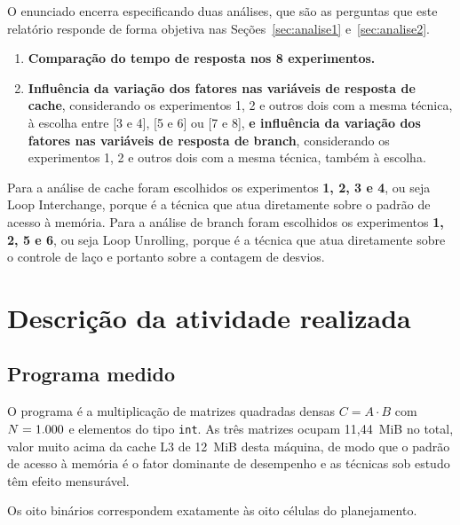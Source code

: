 \documentclass[11pt,a4paper]{article}
\begin{document}
O enunciado encerra especificando duas análises, que são as perguntas que este relatório
responde de forma objetiva nas Seções~\ref{sec:analise1} e~\ref{sec:analise2}.

\begin{enumerate}
  \item \textbf{Comparação do tempo de resposta nos 8 experimentos.}
  \item \textbf{Influência da variação dos fatores nas variáveis de resposta de cache},
  considerando os experimentos 1, 2 e outros dois com a mesma técnica, à escolha entre
  [3 e 4], [5 e 6] ou [7 e 8], \textbf{e influência da variação dos fatores nas
  variáveis de resposta de branch}, considerando os experimentos 1, 2 e outros dois com
  a mesma técnica, também à escolha.
\end{enumerate}

Para a análise de cache foram escolhidos os experimentos \textbf{1, 2, 3 e 4}, ou seja
Loop Interchange, porque é a técnica que atua diretamente sobre o padrão de acesso à
memória. Para a análise de branch foram escolhidos os experimentos
\textbf{1, 2, 5 e 6}, ou seja Loop Unrolling, porque é a técnica que atua diretamente
sobre o controle de laço e portanto sobre a contagem de desvios.

\section{Descrição da atividade realizada}

\subsection{Programa medido}

O programa é a multiplicação de matrizes quadradas densas $C = A \cdot B$ com
$N = 1.000$ e elementos do tipo \texttt{int}. As três matrizes ocupam
11,44~MiB no total, valor muito acima da cache L3 de 12~MiB desta máquina, de
modo que o padrão de acesso à memória é o fator dominante de desempenho e as técnicas
sob estudo têm efeito mensurável.

Os oito binários correspondem exatamente às oito células do planejamento.
\end{document}
